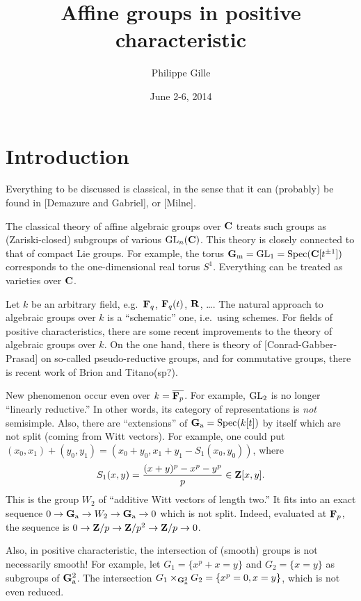 \documentclass{article}
\title{Affine groups in positive characteristic}
\author{Philippe Gille}
\date{June 2-6, 2014}
\begin{document}
\maketitle
\tableofcontents





\section*{Introduction}

Everything to be discussed is classical, in the sense that it can (probably) be 
found in [Demazure and Gabriel], or [Milne]. 

The classical theory of affine algebraic groups over $\mathbf{C}$ treats such groups 
as (Zariski-closed) subgroups of various $\operatorname{GL}_n(\mathbf{C})$. This theory 
is closely connected to that of compact Lie groups. For example, the torus 
$\mathbf{G}_{\mathrm{m}}=\operatorname{GL}_1=\operatorname{Spec}(\mathbf{C}[t^{\pm 1}])$ corresponds to the 
one-dimensional real torus $S^1$. Everything can be treated as varieties over 
$\mathbf{C}$. 

Let $k$ be an arbitrary field, e.g.\ $\mathbf{F}_q$, $\mathbf{F}_q(t)$, $\mathbf{R}$, \ldots. The 
natural approach to algebraic groups over $k$ is a ``schematic'' one, i.e.\ 
using schemes. For fields of positive characteristics, there are some recent 
improvements to the theory of algebraic groups over $k$. On the one hand, there 
is theory of [Conrad-Gabber-Prasad] on so-called pseudo-reductive groups, and 
for commutative groups, there is recent work of Brion and Titano(sp?). 

New phenomenon occur even over $k=\overline{\mathbf{F}_p}$. For example, 
$\operatorname{GL}_2$ is no longer ``linearly reductive.'' In other words, its 
category of representations is \emph{not} semisimple. Also, there are 
``extensions'' of $\mathbf{G}_{\mathrm{a}}=\operatorname{Spec}(k[t])$ by itself which are not 
split (coming from Witt vectors). For example, one could put 
$(x_0,x_1)+(y_0,y_1) = (x_0+y_0, x_1+y_1-S_1(x_0,y_0))$, where 
\[
  S_1(x,y) = \frac{(x+y)^p - x^p-y^p}{p} \in \mathbf{Z}[x,y] .
\]
This is the group $W_2$ of ``additive Witt vectors of length two.'' It fits 
into an exact sequence $0 \to \mathbf{G}_{\mathrm{a}} \to W_2 \to \mathbf{G}_{\mathrm{a}} \to 0$ 
which is not split. Indeed, evaluated at $\mathbf{F}_p$, the sequence is 
$0 \to \mathbf{Z}/p \to \mathbf{Z}/p^2 \to \mathbf{Z}/p \to 0$. 

Also, in positive characteristic, the intersection of (smooth) groups is not 
necessarily smooth! For example, let $G_1=\{x^p+x=y\}$ and 
$G_2=\{x=y\}$ as subgroups of $\mathbf{G}_{\mathrm{a}}^2$. The intersection 
$G_1\times_{\mathbf{G}_{\mathrm{a}}^2} G_2 = \{x^p=0, x=y\}$, which is not even reduced. 
\end{document}
